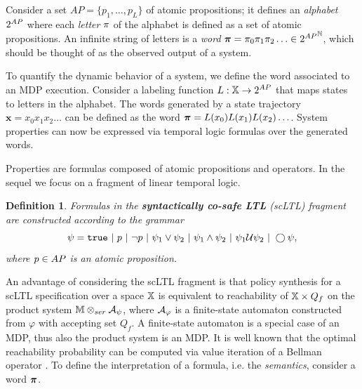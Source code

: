 \documentclass[conference]{IEEEtran}
\newtheorem{definition}{Definition}
\begin{document}
Consider a set $AP = \{ p_1, \ldots, p_L \}$ of atomic propositions; it defines an \emph{alphabet} ${2^{AP}}$ where each \emph{letter} $\pi$ of the alphabet is defined as a set of atomic propositions. An infinite string of letters is a \emph{word} $\boldsymbol{\pi}=\pi_0\pi_1\pi_2\ldots\in{2^{AP}}^{\mathbb{N}}$, which should be thought of as the observed output of a system.

To quantify the dynamic behavior of a system, we define the word associated to an MDP execution. Consider a labeling function $L: \mathbb{X} \rightarrow {2^{AP}}$ that maps states to letters in the alphabet. The words generated by a state trajectory $\mathbf{x} = x_0 x_1 x_2 \ldots$ can be defined as the word $\boldsymbol{\pi} = L(x_0)L(x_1) L(x_2) \ldots$. System properties can now be expressed via temporal logic formulas over the generated words.

Properties are formulas composed of atomic propositions and operators. In the sequel we focus on a fragment of linear temporal logic. 
\begin{definition}
  \label{def:gdtl-syntax}
  Formulas in the \textbf{syntactically co-safe LTL} (scLTL) fragment are constructed according to the grammar
  \begin{equation*}
    \label{eq:scLTL}
    \psi =  \True \ |\ p \ |\ \lnot p \ |\ \psi_1 \vee\psi_2  \ |\ \psi_1 \land \psi_2 \ |\ \psi_1 \ltluntil \psi_2 \ |\ \ltlnext \psi,
  \end{equation*}
  where $p\in AP$ is an atomic proposition.
\end{definition}

An advantage of considering the scLTL fragment is that policy synthesis for a scLTL specification over a space $\mathbb{X}$ is equivalent to reachability of $\mathbb{X}\times Q_f$ on the product system $\mathbb{M} \otimes_{ser} \mathcal{A}_\psi$, where $\mathcal{A}_\varphi$ is a finite-state automaton constructed from $\varphi$ \cite{Belta2017} with accepting set $Q_f$. A finite-state automaton is a special case of an MDP, thus also the product system is an MDP. It is well known that the optimal reachability probability can be computed via value iteration of a Bellman operator \cite{Baier2008}. To define the interpretation of a formula, i.e. the \emph{semantics}, consider a word $\boldsymbol{\pi}$.
\end{document}
